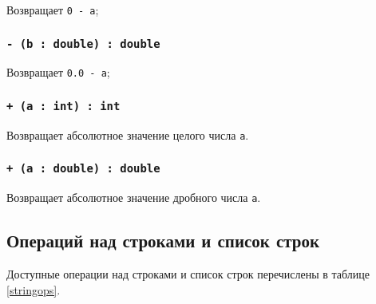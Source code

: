 Возвращает \texttt{0 - a};

\subsubsection{\texttt{- (b : double) : double}}

Возвращает \texttt{0.0 - a};

\subsubsection{\texttt{+ (a : int) : int}}

Возвращает абсолютное значение целого числа \texttt{a}.

\subsubsection{\texttt{+ (a : double) : double}}

Возвращает абсолютное значение дробного числа \texttt{a}.

\subsection{Операций над строками и список строк}

Доступные операции над строками и список строк перечислены в таблице \ref{stringops}.

